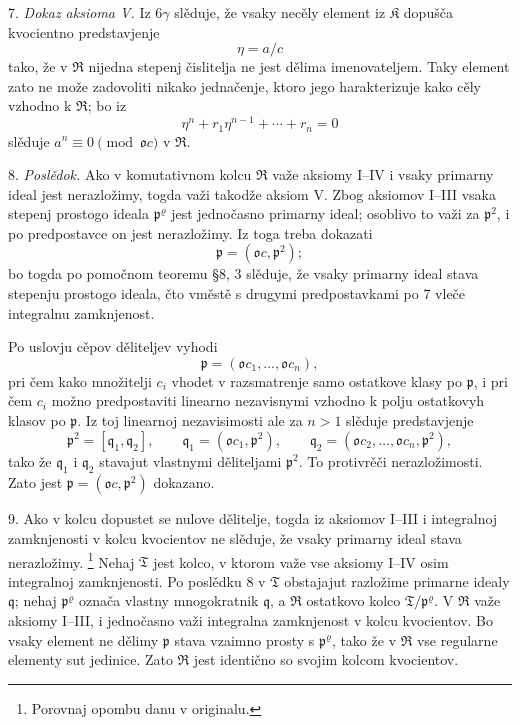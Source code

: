 \documentclass[11pt]{article}
\providecommand{\mR}{\mathfrak{R}}
\providecommand{\mK}{\mathfrak{K}}
\providecommand{\mT}{\mathfrak{T}}
\providecommand{\mo}{\mathfrak{o}}
\providecommand{\mq}{\mathfrak{q}}
\providecommand{\mpideal}{\mathfrak{p}}
\begin{document}
7. \emph{Dokaz aksioma V.} Iz 6$\gamma$ slěduje, že vsaky necěly element iz $\mK$ dopušča kvocientno predstavjenje
\[
        \eta=a/c
\]
tako, že v $\mR$ nijedna stepenj čislitelja ne jest dělima imenovateljem. Taky element zato ne može zadovoliti nikako jednačenje, ktoro jego harakterizuje kako cěly vzhodno k $\mR$; bo iz
\[
        \eta^n+r_1\eta^{n-1}+\cdots+r_n=0
\]
slěduje $a^n\equiv0\pmod{\mo c}$ v $\mR$.

8. \emph{Poslědok.} Ako v komutativnom kolcu $\mR$ važe aksiomy I--IV i vsaky primarny ideal jest nerazložimy, togda važi takodže aksiom V. Zbog aksiomov I--III vsaka stepenj prostogo ideala $\mpideal^\varrho$ jest jednočasno primarny ideal; osoblivo to važi za $\mpideal^2$, i po predpostavce on jest nerazložimy. Iz toga treba dokazati
\[
        \mpideal=(\mo c,\mpideal^2);
\]
bo togda po pomočnom teoremu §8, 3 slěduje, že vsaky primarny ideal stava stepenju prostogo ideala, čto vměstě s drugymi predpostavkami po 7 vleče integralnu zamknjenost.

Po uslovju cěpov děliteljev vyhodi
\[
        \mpideal=(\mo c_1,\ldots,\mo c_n),
\]
pri čem kako množitelji $c_i$ vhodet v razsmatrenje samo ostatkove klasy po $\mpideal$, i pri čem $c_i$ možno predpostaviti linearno nezavisnymi vzhodno k polju ostatkovyh klasov po $\mpideal$. Iz toj linearnoj nezavisimosti ale za $n>1$ slěduje predstavjenje
\[
        \mpideal^2=[\mq_1,\mq_2],
        \qquad \mq_1=(\mo c_1,\mpideal^2),
        \qquad \mq_2=(\mo c_2,\ldots,\mo c_n,\mpideal^2),
\]
tako že $\mq_1$ i $\mq_2$ stavajut vlastnymi děliteljami $\mpideal^2$. To protivrěči nerazložimosti. Zato jest $\mpideal=(\mo c,\mpideal^2)$ dokazano.

9. Ako v kolcu dopustet se nulove dělitelje, togda iz aksiomov I--III i integralnoj zamknjenosti v kolcu kvocientov ne slěduje, že vsaky primarny ideal stava nerazložimy.
\footnote{Porovnaj opombu danu v originalu.}
Nehaj $\mT$ jest kolco, v ktorom važe vse aksiomy I--IV osim integralnoj zamknjenosti. Po poslědku 8 v $\mT$ obstajajut razložime primarne idealy $\mq$; nehaj $\mpideal^\varrho$ označa vlastny mnogokratnik $\mq$, a $\mR$ ostatkovo kolco $\mT/\mpideal^\varrho$. V $\mR$ važe aksiomy I--III, i jednočasno važi integralna zamknjenost v kolcu kvocientov. Bo vsaky element ne dělimy $\mpideal$ stava vzaimno prosty s $\mpideal^\varrho$, tako že v $\mR$ vse regularne elementy sut jedinice. Zato $\mR$ jest identično so svojim kolcom kvocientov.
\end{document}
